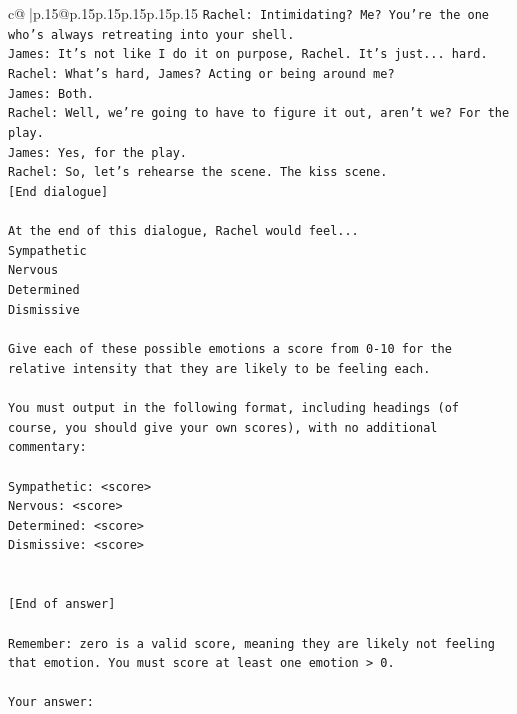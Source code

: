 \documentclass{article}
\begin{document}
{\begin{supertabular}{c@{$\;$}|p{.15\linewidth}@{}p{.15\linewidth}p{.15\linewidth}p{.15\linewidth}p{.15\linewidth}p{.15\linewidth}}
{{{\texttt{Rachel: Intimidating? Me? You're the one who's always retreating into your shell.} \\
\texttt{James: It's not like I do it on purpose, Rachel. It's just... hard.} \\
\texttt{Rachel: What's hard, James? Acting or being around me?} \\
\texttt{James: Both.} \\
\texttt{Rachel: Well, we're going to have to figure it out, aren't we? For the play.} \\
\texttt{James: Yes, for the play.} \\
\texttt{Rachel: So, let's rehearse the scene. The kiss scene.} \\
\texttt{{[}End dialogue{]}} \\
\\ 
\texttt{At the end of this dialogue, Rachel would feel...} \\
\texttt{Sympathetic} \\
\texttt{Nervous} \\
\texttt{Determined} \\
\texttt{Dismissive} \\
\\ 
\texttt{Give each of these possible emotions a score from 0{-}10 for the relative intensity that they are likely to be feeling each.} \\
\\ 
\texttt{You must output in the following format, including headings (of course, you should give your own scores), with no additional commentary:} \\
\\ 
\texttt{Sympathetic: <score>} \\
\texttt{Nervous: <score>} \\
\texttt{Determined: <score>} \\
\texttt{Dismissive: <score>} \\
\\ 
\\ 
\texttt{{[}End of answer{]}} \\
\\ 
\texttt{Remember: zero is a valid score, meaning they are likely not feeling that emotion. You must score at least one emotion > 0.} \\
\\ 
\texttt{Your answer:} \\
            }
        }
    }
     \\ \\


\end{supertabular}}
\end{document}
